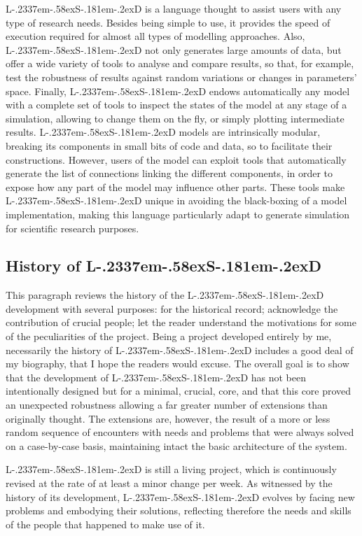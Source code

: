 \documentclass [11pt,a4paper] {book}
\def\LsD{{L\kern-.2337em\lower-.58ex\hbox{S}\kern-.181em\lower-.2ex\hbox{D}}\xspace}
\begin{document}
\LsD is a language thought to assist users with any type of research needs. Besides being simple to use, it provides the speed of execution required for almost all types of modelling approaches. Also, \LsD not only generates large amounts of data, but offer a wide variety of tools to analyse and compare results, so that, for example, test the robustness of results against random variations or changes in parameters' space. Finally, \LsD endows automatically any model with a complete set of tools to inspect the states of the model at any stage of a simulation, allowing to change them on the fly, or simply plotting intermediate results. \LsD models are intrinsically modular, breaking its components in small bits of code and data, so to facilitate their constructions. However, users of the model can exploit tools that automatically generate the list of connections linking the different components, in order to expose how any part of the model may influence other parts. These tools make \LsD unique in avoiding the black-boxing of a model implementation, making this language particularly adapt to generate simulation for scientific research purposes.


\subsection{History of \LsD}

This paragraph reviews the history of the \LsD development with several purposes: for the historical record; acknowledge the contribution of crucial people; let the reader understand the motivations for some of the peculiarities of the project. Being a project developed entirely by me, necessarily the history of \LsD includes a good deal of my biography, that I hope the readers would excuse. The overall goal is to show that the development of \LsD has not been intentionally designed but for a minimal, crucial, core, and that this core proved an unexpected robustness allowing a far greater number of extensions than originally thought. The extensions are, however, the result of a more or less random sequence of encounters with needs and problems that were always solved on a case-by-case basis, maintaining intact the basic architecture of the system. 

\LsD is still a living project, which is continuously revised at the rate of at least a minor change per week. As witnessed by the history of its development, \LsD evolves by facing new problems and embodying their solutions, reflecting therefore the needs and skills of the people that happened to make use of it.
\end{document}
